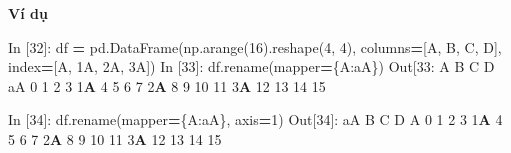 \documentclass[
]{book}
\newenvironment{Shaded}{\begin{snugshade}}{\end{snugshade}}
\newcommand{\DecValTok}[1]{\textcolor[rgb]{0.00,0.00,0.81}{#1}}
\newcommand{\ErrorTok}[1]{\textcolor[rgb]{0.64,0.00,0.00}{\textbf{#1}}}
\newcommand{\NormalTok}[1]{#1}
\newcommand{\OperatorTok}[1]{\textcolor[rgb]{0.81,0.36,0.00}{\textbf{#1}}}
\newcommand{\StringTok}[1]{\textcolor[rgb]{0.31,0.60,0.02}{#1}}
\begin{document}
\textbf{Ví dụ}

\begin{Shaded}
\begin{Highlighting}[]
\NormalTok{In [}\DecValTok{32}\NormalTok{]: df }\OperatorTok{=}\NormalTok{ pd.DataFrame(np.arange(}\DecValTok{16}\NormalTok{).reshape(}\DecValTok{4}\NormalTok{, }\DecValTok{4}\NormalTok{),}
\NormalTok{                        columns}\OperatorTok{=}\NormalTok{[}\StringTok{\textquotesingle{}A\textquotesingle{}}\NormalTok{, }\StringTok{\textquotesingle{}B\textquotesingle{}}\NormalTok{, }\StringTok{\textquotesingle{}C\textquotesingle{}}\NormalTok{, }\StringTok{\textquotesingle{}D\textquotesingle{}}\NormalTok{],}
\NormalTok{                        index}\OperatorTok{=}\NormalTok{[}\StringTok{\textquotesingle{}A\textquotesingle{}}\NormalTok{, }\StringTok{\textquotesingle{}1A\textquotesingle{}}\NormalTok{, }\StringTok{\textquotesingle{}2A\textquotesingle{}}\NormalTok{, }\StringTok{\textquotesingle{}3A\textquotesingle{}}\NormalTok{])}
\NormalTok{In [}\DecValTok{33}\NormalTok{]: df.rename(mapper}\OperatorTok{=}\NormalTok{\{}\StringTok{\textquotesingle{}A\textquotesingle{}}\NormalTok{:}\StringTok{\textquotesingle{}aA\textquotesingle{}}\NormalTok{\})}
\NormalTok{Out[}\DecValTok{33}\NormalTok{: }
\NormalTok{     A   B   C   D}
\NormalTok{aA   }\DecValTok{0}   \DecValTok{1}   \DecValTok{2}   \DecValTok{3}
\DecValTok{1}\ErrorTok{A}   \DecValTok{4}   \DecValTok{5}   \DecValTok{6}   \DecValTok{7}
\DecValTok{2}\ErrorTok{A}   \DecValTok{8}   \DecValTok{9}  \DecValTok{10}  \DecValTok{11}
\DecValTok{3}\ErrorTok{A}  \DecValTok{12}  \DecValTok{13}  \DecValTok{14}  \DecValTok{15}

\NormalTok{In [}\DecValTok{34}\NormalTok{]: df.rename(mapper}\OperatorTok{=}\NormalTok{\{}\StringTok{\textquotesingle{}A\textquotesingle{}}\NormalTok{:}\StringTok{\textquotesingle{}aA\textquotesingle{}}\NormalTok{\}, axis}\OperatorTok{=}\DecValTok{1}\NormalTok{)}
\NormalTok{Out[}\DecValTok{34}\NormalTok{]:}
\NormalTok{    aA   B   C   D}
\NormalTok{A    }\DecValTok{0}   \DecValTok{1}   \DecValTok{2}   \DecValTok{3}
\DecValTok{1}\ErrorTok{A}   \DecValTok{4}   \DecValTok{5}   \DecValTok{6}   \DecValTok{7}
\DecValTok{2}\ErrorTok{A}   \DecValTok{8}   \DecValTok{9}  \DecValTok{10}  \DecValTok{11}
\DecValTok{3}\ErrorTok{A}  \DecValTok{12}  \DecValTok{13}  \DecValTok{14}  \DecValTok{15}


\end{Highlighting}
\end{Shaded}
\end{document}
